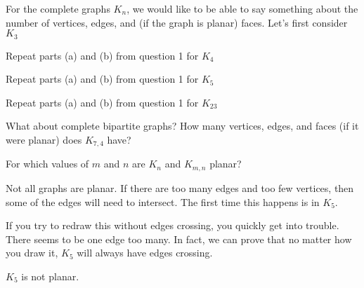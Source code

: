 \documentclass[12pt]{article}
\begin{document}
\begin{activity}
\begin{questions}
\question For the complete graphs $K_n$, we would like to be able to say something about the number of vertices, edges, and (if the graph is planar) faces. Let's first consider $K_3$
\question Repeat parts (a) and (b) from question 1 for $K_4$

\question Repeat parts (a) and (b) from question 1 for $K_5$

\question Repeat parts (a) and (b) from question 1 for $K_{23}$


\question What about complete bipartite graphs?  How many vertices, edges, and faces (if it were planar) does $K_{7,4}$ have?

\question For which values of $m$ and $n$ are $K_n$ and $K_{m,n}$ planar?
\end{questions}
\end{activity}


Not all graphs are planar.  If there are too many edges and too few vertices, then some of the edges will need to intersect.  The first time this happens is in $K_5$.

\begin{center}
\end{center}

If you try to redraw this without edges crossing, you quickly get into trouble.  There seems to be one edge too many.  In fact, we can prove that no matter how you draw it, $K_5$ will always have edges crossing.

\begin{theorem}
  $K_5$ is not planar.
\end{theorem}
\end{document}
